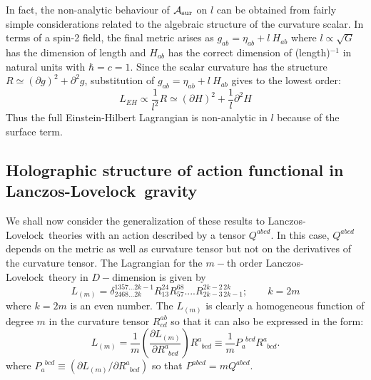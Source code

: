 \documentclass[12pt]{iopart}
\newcommand{\LL}{Lanczos-Lovelock}
\begin{document}
 
 In fact, the non-analytic behaviour of $\mathcal{A}_{\rm sur}$ on $l$  can be obtained from 
 fairly simple considerations 
  related to the algebraic structure 
  of  the curvature scalar.
 In terms of a spin-2 field, the final metric arises as $g_{ab}=\eta_{ab}+l\ H_{ab}$
where $l\propto \sqrt{G }$ has the dimension of length and $H_{ab}$ has the correct dimension of
(length)$^{-1}$ in natural units with $\hbar=c=1$. 
  Since the scalar curvature has the structure $R\simeq (\partial g)^2+\partial^2g$, substitution of $g_{ab}=\eta_{ab}+l\ H_{ab}$ gives to the lowest order:
\begin{equation}
L_{EH}\propto \frac{1}{l^2}R\simeq (\partial H)^2+\frac{1}{l}\partial^2 H
\end{equation}
Thus the full Einstein-Hilbert Lagrangian is non-analytic in $l$ because of the surface term. 


\subsection{Holographic structure of action functional in \LL\ gravity}


We shall now consider the generalization of these results to \LL\ theories with an action described by a tensor $Q^{abcd}$.
In this case, $Q^{abcd}$  depends on the metric as well as curvature tensor but not on the derivatives of the curvature tensor.
The Lagrangian for the $m-$th order \LL\ theory in $D-$dimension is given by
\begin{equation}
L_{(m)}=\delta^{1357...2k-1}_{2468...2k}R^{24}_{13}R^{68}_{57}
....R^{2k-2\,2k}_{2k-3\,2k-1}; \qquad k=2m
\label{elmlll}
\end{equation} 
where $k=2m$ is an even number. 
The $L_{(m)}$ is clearly a homogeneous function of degree $m$ in
the curvature tensor $R^{ab}_{cd}$ so that it  can also  be expressed in the form:
\begin{equation}
L_{(m)}=\frac{1}{m}\left(\frac{\partial L_{(m)}}{\partial R^a_{\phantom{a}bcd} }\right)R^a_{\phantom{a}bcd}\equiv \frac{1}{m}P_a^{\phantom{a}bcd}R^a_{\phantom{a}bcd}.
\end{equation} 
where  $P_a^{\phantom{a}bcd}\equiv (\partial L_{(m)}/\partial R^a_{\phantom{a}bcd} )$
so that $P^{abcd}=mQ^{abcd}$. 
\end{document}
